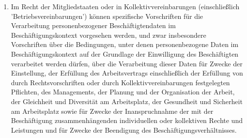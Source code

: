 \begin{enumerate}
   \item Im Recht der Mitgliedstaaten oder in Kollektivvereinbarungen (einschließlich ’Betriebsvereinbarungen’) können
    spezifische Vorschriften für die Verarbeitung personenbezogener Beschäftigtendaten im Beschäftigungskontext
    vorgesehen werden, und zwar insbesondere Vorschriften über die Bedingungen, unter denen personenbezogene Daten im
    Beschäftigungskontext auf der Grundlage der Einwilligung des Beschäftigten verarbeitet werden dürfen, über die
    Verarbeitung dieser Daten für Zwecke der Einstellung, der Erfüllung des Arbeitsvertrags einschließlich der
    Erfüllung von durch Rechtsvorschriften oder durch Kollektivvereinbarungen festgelegten Pflichten, des Managements,
    der Planung und der Organisation der Arbeit, der Gleichheit und Diversität am Arbeitsplatz, der Gesundheit und
    Sicherheit am Arbeitsplatz sowie für Zwecke der Inanspruchnahme der mit der Beschäftigung zusammenhängenden
    individuellen oder kollektiven Rechte und Leistungen und für Zwecke der Beendigung des
    Beschäftigungsverhältnisses.%
   \label{itm:eg-155}
   


\end{enumerate}
